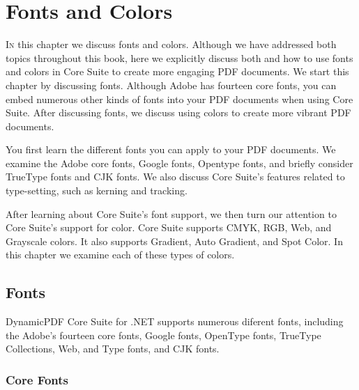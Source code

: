 \documentclass[american,letterpaper]{tufte-book}
\numberwithin{equation}{section}
\numberwithin{figure}{section}
\def\color#1{}%
\begin{document}
{\color{white}
\chapter{Fonts and Colors}\label{chap:fonts-colors}
\color{black}
\BgThispage
\vspace{8.00em}
\lettrine[lines=2,lhang=0.1]{I}{n} this chapter we discuss fonts and colors. Although we have addressed
both topics throughout this book, here we explicitly discuss both
and how to use fonts and colors in Core Suite to create more engaging PDF documents.
We start this chapter by discussing fonts. Although Adobe has fourteen
core fonts, you can embed numerous other kinds of fonts into your
PDF documents when using Core Suite. After discussing fonts, we discuss
using colors to create more vibrant PDF documents.

You first learn the different fonts you can apply to your PDF documents.
We examine the Adobe core fonts, Google fonts, Opentype fonts, and
briefly consider TrueType fonts and CJK fonts. We also discuss Core
Suite's features related to type-setting, such as kerning and tracking.

After learning about Core Suite's font support, we then turn our attention
to Core Suite's support for color. Core Suite supports CMYK, RGB,
Web, and Grayscale colors. It also supports Gradient, Auto Gradient,
and Spot Color. In this chapter we examine each of these types of
colors.

\section{Fonts}\label{sec:Fonts}
DynamicPDF Core Suite for .NET supports numerous diferent fonts, including the Adobe's fourteen core fonts, Google fonts, OpenType fonts, TrueType Collections, Web, and Type fonts, and CJK fonts.  
\subsection{Core Fonts}

}
\end{document}
